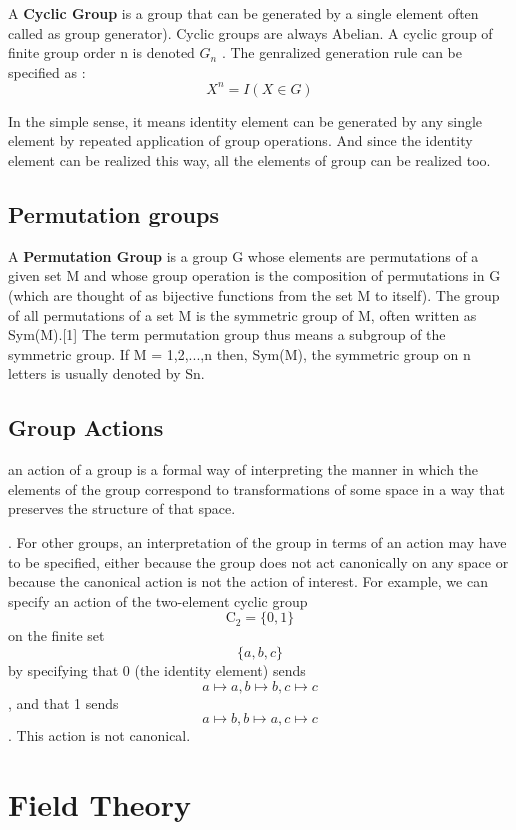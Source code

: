 A \textbf{Cyclic Group} is a group that can be generated by a single element often called as group generator). Cyclic groups are always Abelian. A cyclic group of finite group order n is denoted $G_n$ . The genralized generation rule can be specified as : \\

\[ X^n  = I ( X \in G ) \]

In the simple sense, it means identity element can be generated by any single element by repeated application of group operations. And since the identity element can be realized this way, all the elements of group can be realized too.\\

\subsection{Permutation groups}

A \textbf{Permutation Group} is a group G whose elements are permutations of a given set M and whose group operation is the composition of permutations in G (which are thought of as bijective functions from the set M to itself). The group of all permutations of a set M is the symmetric group of M, often written as Sym(M).[1] The term permutation group thus means a subgroup of the symmetric group. If M = {1,2,...,n} then, Sym(M), the symmetric group on n letters is usually denoted by Sn.

\subsection{Group Actions}

an action of a group is a formal way of interpreting the manner in which the elements of the group correspond to transformations of some space in a way that preserves the structure of that space.

. For other groups, an interpretation of the group in terms of an action may have to be specified, either because the group does not act canonically on any space or because the canonical action is not the action of interest. For example, we can specify an action of the two-element cyclic group \[ \displaystyle \mathrm {C} _{2}=\{0,1\}\] on the finite set \[\displaystyle \{a,b,c\}\] by specifying that 0 (the identity element) sends \[ \displaystyle a\mapsto a,b\mapsto b,c\mapsto c\], and that 1 sends \[ \displaystyle a\mapsto b,b\mapsto a,c\mapsto c \]. This action is not canonical.


\section{Field Theory}

